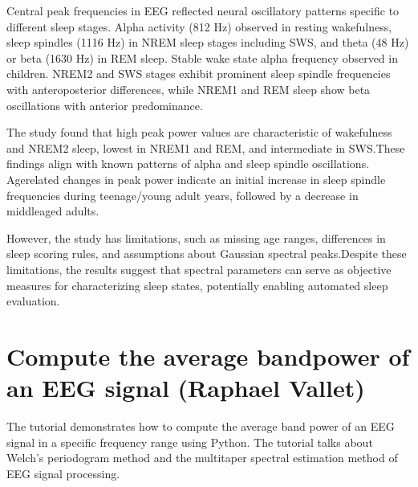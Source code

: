 \documentclass[letterpaper,10pt,english]{sphinxmanual}
\begin{document}
\sphinxAtStartPar
Central peak frequencies in EEG reflected neural oscillatory patterns specific to different sleep stages. Alpha activity (8\sphinxhyphen{}12 Hz) observed in resting wakefulness, sleep spindles (11\sphinxhyphen{}16 Hz) in NREM sleep stages including SWS, and theta (4\sphinxhyphen{}8 Hz) or beta (16\sphinxhyphen{}30 Hz) in REM sleep. Stable wake state alpha frequency observed in children. NREM2 and SWS stages exhibit prominent sleep spindle frequencies with antero\sphinxhyphen{}posterior differences, while NREM1 and REM sleep show beta oscillations with anterior predominance.

\sphinxAtStartPar
The study found that high peak power values are characteristic of wakefulness and NREM2 sleep, lowest in NREM1 and REM, and intermediate in SWS.These findings align with known patterns of alpha and sleep spindle oscillations. Age\sphinxhyphen{}related changes in peak power indicate an initial increase in sleep spindle frequencies during teenage/young adult years, followed by a decrease in middle\sphinxhyphen{}aged adults.

\sphinxAtStartPar
However, the study has limitations, such as missing age ranges, differences in sleep scoring rules, and assumptions about Gaussian spectral peaks.Despite these limitations, the results suggest that spectral parameters can serve as objective measures for characterizing sleep states, potentially enabling automated sleep evaluation.


\section{Compute the average bandpower of an EEG signal (Raphael Vallet)}
\label{\detokenize{summary:compute-the-average-bandpower-of-an-eeg-signal-raphael-vallet}}
\sphinxAtStartPar
{}

\sphinxAtStartPar
The tutorial demonstrates how to compute the average band power of an EEG signal in a specific frequency range using Python. The tutorial talks about Welch’s periodogram method and the multitaper spectral estimation method of EEG signal processing.
\end{document}
